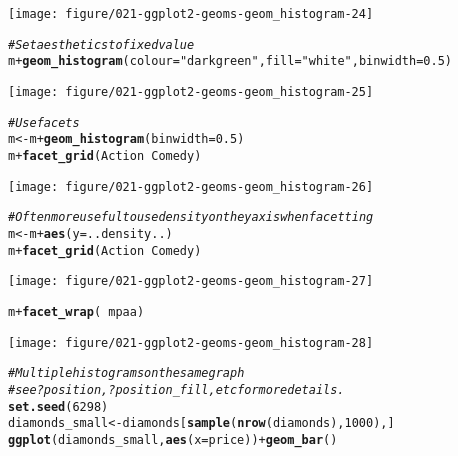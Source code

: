 \documentclass[a4paper,titlepage]{tufte-handout}\usepackage[]{graphicx}\usepackage[]{color}
\makeatletter
\def\maxwidth{ %
  \ifdim\Gin@nat@width>\linewidth
    \linewidth
  \else
    \Gin@nat@width
  \fi
}
\newcommand{\hlnum}[1]{\textcolor[rgb]{0.686,0.059,0.569}{#1}}%
\newcommand{\hlstr}[1]{\textcolor[rgb]{0.192,0.494,0.8}{#1}}%
\newcommand{\hlcom}[1]{\textcolor[rgb]{0.678,0.584,0.686}{\textit{#1}}}%
\newcommand{\hlopt}[1]{\textcolor[rgb]{0,0,0}{#1}}%
\newcommand{\hlstd}[1]{\textcolor[rgb]{0.345,0.345,0.345}{#1}}%
\newcommand{\hlkwb}[1]{\textcolor[rgb]{0.69,0.353,0.396}{#1}}%
\newcommand{\hlkwc}[1]{\textcolor[rgb]{0.333,0.667,0.333}{#1}}%
\newcommand{\hlkwd}[1]{\textcolor[rgb]{0.737,0.353,0.396}{\textbf{#1}}}%
\newenvironment{kframe}{%
 \def\at@end@of@kframe{}%
 \ifinner\ifhmode%
  \def\at@end@of@kframe{\end{minipage}}%
  \begin{minipage}{\columnwidth}%
 \fi\fi%
 \def\FrameCommand##1{\hskip\@totalleftmargin \hskip-\fboxsep
 \colorbox{shadecolor}{##1}\hskip-\fboxsep
     \hskip-\linewidth \hskip-\@totalleftmargin \hskip\columnwidth}%
 \MakeFramed {\advance\hsize-\width
   \@totalleftmargin\z@ \linewidth\hsize
   \@setminipage}}%
 {\par\unskip\endMakeFramed%
 \at@end@of@kframe}
\newenvironment{knitrout}{}{} %
\makeatother
\begin{document}
\begin{knitrout}
\begin{kframe}
{\ttfamily\noindent\color{warningcolor}{\#\# Warning in loop\_apply(n, do.ply): Stacking not well defined when ymin != 0}}\end{kframe}
\texttt{[image: figure/021-ggplot2-geoms-geom\_histogram-24]} 
\begin{kframe}\begin{alltt}
\hlcom{# Set aesthetics to fixed value}
\hlstd{m} \hlopt{+} \hlkwd{geom_histogram}\hlstd{(}\hlkwc{colour} \hlstd{=} \hlstr{"darkgreen"}\hlstd{,} \hlkwc{fill} \hlstd{=} \hlstr{"white"}\hlstd{,} \hlkwc{binwidth} \hlstd{=} \hlnum{0.5}\hlstd{)}
\end{alltt}
\end{kframe}
\texttt{[image: figure/021-ggplot2-geoms-geom\_histogram-25]} 
\begin{kframe}\begin{alltt}
\hlcom{# Use facets}
\hlstd{m} \hlkwb{<-} \hlstd{m} \hlopt{+} \hlkwd{geom_histogram}\hlstd{(}\hlkwc{binwidth} \hlstd{=} \hlnum{0.5}\hlstd{)}
\hlstd{m} \hlopt{+} \hlkwd{facet_grid}\hlstd{(Action} \hlopt{~} \hlstd{Comedy)}
\end{alltt}
\end{kframe}
\texttt{[image: figure/021-ggplot2-geoms-geom\_histogram-26]} 
\begin{kframe}\begin{alltt}
\hlcom{# Often more useful to use density on the y axis when facetting}
\hlstd{m} \hlkwb{<-} \hlstd{m} \hlopt{+} \hlkwd{aes}\hlstd{(}\hlkwc{y} \hlstd{= ..density..)}
\hlstd{m} \hlopt{+} \hlkwd{facet_grid}\hlstd{(Action} \hlopt{~} \hlstd{Comedy)}
\end{alltt}
\end{kframe}
\texttt{[image: figure/021-ggplot2-geoms-geom\_histogram-27]} 
\begin{kframe}\begin{alltt}
\hlstd{m} \hlopt{+} \hlkwd{facet_wrap}\hlstd{(}\hlopt{~} \hlstd{mpaa)}
\end{alltt}
\end{kframe}
\texttt{[image: figure/021-ggplot2-geoms-geom\_histogram-28]} 
\begin{kframe}\begin{alltt}
\hlcom{# Multiple histograms on the same graph}
\hlcom{# see ?position, ?position_fill, etc for more details.}
\hlkwd{set.seed}\hlstd{(}\hlnum{6298}\hlstd{)}
\hlstd{diamonds_small} \hlkwb{<-} \hlstd{diamonds[}\hlkwd{sample}\hlstd{(}\hlkwd{nrow}\hlstd{(diamonds),} \hlnum{1000}\hlstd{), ]}
\hlkwd{ggplot}\hlstd{(diamonds_small,} \hlkwd{aes}\hlstd{(}\hlkwc{x}\hlstd{=price))} \hlopt{+} \hlkwd{geom_bar}\hlstd{()}

\end{alltt}
\end{kframe}
\end{knitrout}
\end{document}
